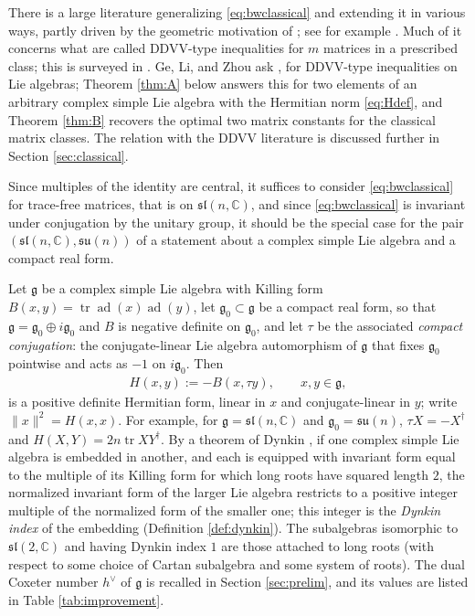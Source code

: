 \documentclass [leqno, 10pt]{amsart}
\theoremstyle{definition}
\numberwithin{equation}{section}
\newcommand{\su}{\mathfrak{su}}
\newcommand{\sll}{\mathfrak{sl}}
\newcommand{\g}{\mathfrak{g}}
\newcommand{\ad}{\operatorname{ad}}
\newcommand{\com}{\mathbb C}
\newcommand{\tr}{\operatorname{tr}}
\newcommand{\gz}{\g_{0}}
\newcommand{\hv}{h^\vee}
\newcommand{\norm}[1]{\lVert #1\rVert}
\begin{document}
There is a large literature generalizing \eqref{eq:bwclassical} and extending it in various ways, partly driven by the geometric motivation of \cite{Chern-Docarmo-Kobayashi}; see for example \cite{Cheng-Vong-Wenzel, Ge, Ge-Li-Zhou, Lu-remarks, Lu-Wenzel, Wu-Liu}. Much of it concerns what are called DDVV-type inequalities for $m$ matrices in a prescribed class; this is surveyed in \cite{Ge-Li-Tang-Zhou-survey}. Ge, Li, and Zhou ask \cite[Section 1, question (2)]{Ge-Li-Zhou}, \cite[Question 4.2]{Ge-Li-Tang-Zhou-survey} for DDVV-type inequalities on Lie algebras; Theorem \ref{thm:A} below answers this for two elements of an arbitrary complex simple Lie algebra with the Hermitian norm \eqref{eq:Hdef}, and Theorem \ref{thm:B} recovers the optimal two matrix constants for the classical matrix classes. The relation with the DDVV literature is discussed further in Section \ref{sec:classical}.

Since multiples of the identity are central, it suffices to consider \eqref{eq:bwclassical} for trace-free matrices, that is on $\sll(n, \com)$, and since \eqref{eq:bwclassical} is invariant under conjugation by the unitary group, it should be the special case for the pair $(\sll(n, \com), \su(n))$ of a statement about a complex simple Lie algebra and a compact real form.

Let $\g$ be a complex simple Lie algebra with Killing form $B(x, y) = \tr\ad(x)\ad(y)$, let $\gz \subset \g$ be a compact real form, so that $\g = \gz \oplus i\gz$ and $B$ is negative definite on $\gz$, and let $\tau$ be the associated \emph{compact conjugation}: the conjugate-linear Lie algebra automorphism of $\g$ that fixes $\gz$ pointwise and acts as $-1$ on $i\gz$. Then
\begin{align}\label{eq:Hdef}
H(x,y) := -B(x,\tau y), \qquad x,y\in\g,
\end{align}
is a positive definite Hermitian form, linear in $x$ and conjugate-linear in $y$; write $\norm{x}^{2} = H(x, x)$. For example, for $\g = \sll(n, \com)$ and $\gz = \su(n)$, $\tau X = -X^{\dagger}$ and $H(X, Y) = 2n\tr XY^{\dagger}$. By a theorem of Dynkin \cite[Theorem~2.2]{Dynkin-semisimplesubalgebras}, if one complex simple Lie algebra is embedded in another, and each is equipped with invariant form equal to the multiple of its Killing form for which long roots have squared length $2$, the normalized invariant form of the larger Lie algebra restricts to a positive integer multiple of the normalized form of the smaller one; this integer is the \emph{Dynkin index} of the embedding (Definition \ref{def:dynkin}). The subalgebras isomorphic to $\sll(2, \com)$ and having Dynkin index $1$ are those attached to long roots (with respect to some choice of Cartan subalgebra and some system of roots). The dual Coxeter number $\hv$ of $\g$ is recalled in Section \ref{sec:prelim}, and its values are listed in Table \ref{tab:improvement}.
\end{document}
